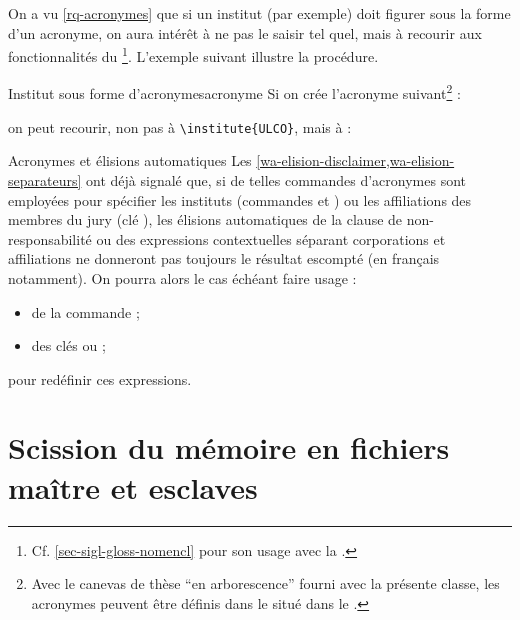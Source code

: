 On a vu \vref{rq-acronymes} que si un institut (par exemple) doit figurer
sous la forme d'un acronyme, on aura intérêt à ne pas le saisir tel
quel, mais à recourir aux fonctionnalités du
\footnote{Cf. \vref{sec-sigl-gloss-nomencl} pour
  son usage avec la \yatCl{}.}. L'exemple suivant illustre la
procédure.
%
\begin{dbexample}{Institut sous forme d'acronymes}{acronyme}
  Si on crée l'acronyme suivant\footnote{Avec le canevas de thèse \enquote{en
      arborescence} fourni avec la présente classe, les acronymes peuvent être
    définis dans le \File{\acronymsfile} situé dans le
    \Folder{\auxiliarydirectory}.} :
\begin{preamblecode}[listing options={moretexcs={newacronym}}]
\end{preamblecode}
on peut recourir, non pas à \lstinline[deletekeywords={[5]institute}]|\institute{ULCO}|, mais à :
\begin{preamblecode}[listing options={deletekeywords={[5]institute}}]
\end{preamblecode}
\end{dbexample}

\begin{dbremark}{Acronymes et élisions automatiques}{}
  Les \vref{wa-elision-disclaimer,wa-elision-separateurs} ont déjà
  signalé que, si de telles commandes d'acronymes sont employées pour spécifier
  les instituts (commandes  et ) ou les
  affiliations des membres du jury (clé ), les élisions
  automatiques de la clause de non-responsabilité ou des expressions
  contextuelles séparant corporations et affiliations ne donneront pas toujours le
  résultat escompté (en français notamment). On pourra alors le cas échéant
  faire usage :
  \begin{itemize}
  \item de la commande  ;
  \item des clés  ou  ;
  \end{itemize}
  pour redéfinir ces expressions.
\end{dbremark}

\section{Scission du mémoire en fichiers maître et esclaves}
\label{sec-repart-du-memo}

